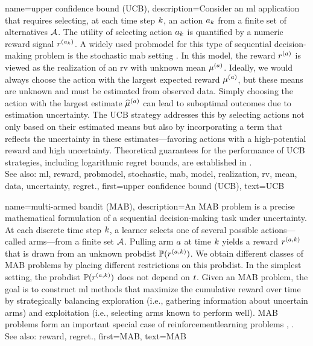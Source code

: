 {name={upper confidence bound (UCB)},
	description={Consider an \gls{ml} 
		application that requires selecting, at each time step $k$, an action $a_{k}$ 
		from a finite set of alternatives $\mathcal{A}$. The utility of selecting action $a_{k}$ 
		is quantified by a numeric \gls{reward} signal $r^{(a_{k})}$. 
		A widely used \gls{probmodel} for this type of sequential decision-making problem 
		is the \gls{stochastic} \gls{mab} setting \cite{Bubeck2012}. In this \gls{model}, 
		the \gls{reward} $r^{(a)}$ is viewed as the \gls{realization} of an \gls{rv} 
		with unknown \gls{mean} $\mu^{(a)}$. Ideally, we would always choose the 
		action with the largest expected \gls{reward} $\mu^{(a)}$, but these 
		\glspl{mean} are unknown and must be estimated from observed \gls{data}. Simply 
		choosing the action with the largest estimate $\widehat{\mu}^{(a)}$ can 
		lead to suboptimal outcomes due to estimation \gls{uncertainty}. The UCB strategy 
		addresses this by selecting actions not only based on their estimated \glspl{mean} but 
		also by incorporating a term that reflects the \gls{uncertainty} in these estimates—favoring 
		actions with a high-potential \gls{reward} and high \gls{uncertainty}. Theoretical guarantees 
		for the performance of UCB strategies, including logarithmic \gls{regret} bounds, are established in \cite{Bubeck2012}.
					\\ 
		See also: \gls{ml}, \gls{reward}, \gls{probmodel}, \gls{stochastic}, \gls{mab}, \gls{model}, \gls{realization}, \gls{rv}, \gls{mean}, \gls{data}, \gls{uncertainty}, \gls{regret}.},
	first={upper confidence bound (UCB)},
	text={UCB} 
}

{name={multi-armed bandit (MAB)},
	description={An MAB  problem is a precise mathematical 
		formulation of a sequential decision-making task under \gls{uncertainty}. At each 
		discrete time step $k$, a learner selects one of several possible 
		actions—called arms—from a finite set $\mathcal{A}$. Pulling arm $a$ at time 
		$k$ yields a \gls{reward} $r^{(a,k)}$ that is drawn from an unknown 
		\gls{probdist} $\mathbb{P}({r^{(a,k)}})$. We obtain different classes 
		of MAB problems by placing different restrictions on this \gls{probdist}. In the simplest 
		setting, the \gls{probdist} $\mathbb{P}({r^{(a,k)}})$ does not depend on $t$. 
		Given an MAB problem, the goal is to construct \gls{ml} methods that maximize the cumulative 
		\gls{reward} over time by strategically balancing exploration (i.e., gathering information 
		about uncertain arms) and exploitation (i.e., selecting arms known to perform well). 
		MAB problems form an important special case of \gls{reinforcementlearning} problems \cite{Bubeck2012}, \cite{SuttonEd2}.
					\\ 
		See also: \gls{reward}, \gls{regret}.},
	first={MAB},
	text={MAB}
}




